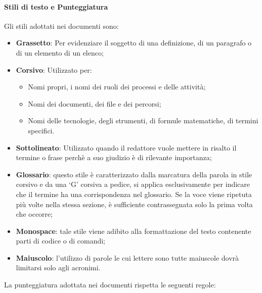 			\paragraph{Stili di testo e Punteggiatura}
				Gli stili adottati nei documenti sono: \\
				\begin{itemize}
					\item\textbf{Grassetto}: Per evidenziare il soggetto di una definizione, di un paragrafo o di un elemento di un elenco;
					\item\textbf{Corsivo}: Utilizzato per:
						\begin{itemize}
							\item Nomi propri, i nomi dei ruoli dei processi e delle attività;
							\item Nomi dei documenti, dei file e dei percorsi;
							\item Nomi delle tecnologie, degli strumenti, di formule matematiche, di termini specifici.
						\end{itemize}
					\item\textbf{Sottolineato}: Utilizzato quando il redattore vuole mettere in risalto il termine o frase perchè a suo giudizio è di rilevante importanza;
					\item\textbf{Glossario}: questo stile è caratterizzato dalla marcatura della parola in stile corsivo e da una ‘G’ corsiva a pedice, si applica esclusivamente per indicare che il termine ha una corrispondenza nel glossario. Se la voce viene ripetuta più volte nella stessa sezione, è sufficiente contrassegnata solo la prima volta che occorre;
					\item\textbf{Monospace}: tale stile viene adibito alla formattazione del testo contenente parti di codice o di comandi;
					\item\textbf{Maiuscolo}: l’utilizzo di parole le cui lettere sono tutte maiuscole dovrà limitarsi solo agli acronimi.
				\end{itemize}
				La punteggiatura adottata nei documenti rispetta le seguenti regole: \\
